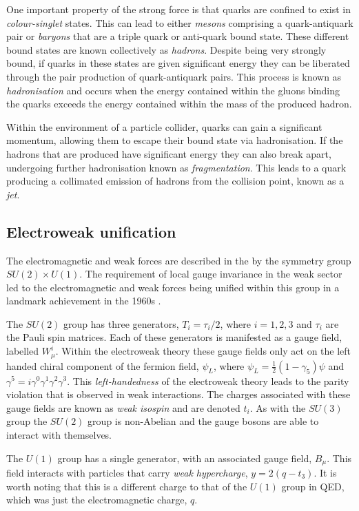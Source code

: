 One important property of the strong force is that quarks are
confined to exist in \emph{colour-singlet} states. This can lead to either
\emph{mesons} comprising a quark-antiquark pair or \emph{baryons} that are a
triple quark or anti-quark bound state. These different bound states are known
collectively as \emph{hadrons}. Despite being very strongly bound, if
quarks in these states are given significant energy they can be
liberated through the pair production of quark-antiquark pairs. This
process is known as \emph{hadronisation} and occurs when the energy
contained within the gluons binding the quarks exceeds the energy
contained within the mass of the produced hadron. 

Within
the environment of a particle collider, quarks can gain a
significant momentum, allowing them to escape their bound state via
hadronisation. If the hadrons that are produced have
significant energy they can also break apart, undergoing further
hadronisation known as \emph{fragmentation}. This
leads to a quark producing a collimated emission of hadrons from
the collision point, known as a \emph{jet}.

\subsection{Electroweak unification}

The electromagnetic and weak forces are described in the \SM by the
symmetry group $SU(2)\times U(1)$. The requirement of local gauge
invariance in the weak sector led to the electromagnetic and weak
forces being unified within this group in a landmark achievement in
the 1960s \cite{Glashow:1961tr,PhysRevLett.19.1264,Salam:1964ry}.

The $SU(2)$ group has three generators, $T_i=\tau_i/2$, where
$i=1,2,3$ and $\tau_i$ are the Pauli spin matrices. Each of these generators is manifested
as a gauge field, labelled $W_{\mu}^i$. Within the electroweak theory
these gauge fields only act on the left handed chiral component of the
fermion field, $\psi_L$, where $\psi_L = \frac{1}{2}(1-\gamma_5)\psi$ and
$\gamma^5=i\gamma^0\gamma^1\gamma^2\gamma^3$. This 
\emph{left-handedness} of the electroweak theory leads to the parity violation
that is observed in weak interactions. The charges associated with
these gauge fields are known as \emph{weak isospin} and are denoted
$t_i$. As with the $SU(3)$ group the $SU(2)$ group is non-Abelian and
the gauge bosons are able to interact with themselves.

The $U(1)$ group has a single generator, with an associated gauge
field, $B_{\mu}$. This field interacts with particles that
carry \emph{weak hypercharge}, $y=2(q-t_3)$. It is worth noting that this
is a different charge to that of the $U(1)$ group in \ac{QED}, which was
just the electromagnetic charge, $q$. 

